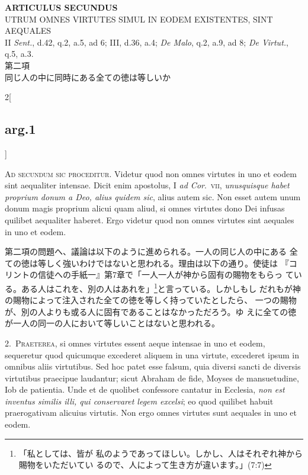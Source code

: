 \documentclass[paper=a4paper,fontsize=10pt,jafontsize=9pt,titlepage]{jlreq}
\begin{document}
\begin{center}
{\Large {\bfseries ARTICULUS SECUNDUS}}\\
{\large UTRUM OMNES VIRTUTES SIMUL IN EODEM EXISTENTES, SINT AEQUALES}\\
{\footnotesize II {\itshape Sent.}, d.42, q.2, a.5, ad 6; III, d.36, a.4; {\itshape De Malo}, q.2, a.9, ad 8; {\itshape De Virtut.}, q.5, a.3.}\\
{\Large 第二項\\同じ人の中に同時にある全ての徳は等しいか}
\end{center}

\begin{paracol}{2}[\subsection{arg.1}]

{\scshape Ad secundum sic proceditur}. Videtur quod non omnes virtutes
in uno et eodem sint aequaliter intensae. Dicit enim apostolus, I
{\itshape ad Cor}.~{\scshape vii}, {\itshape unusquisque habet
proprium donum a Deo, alius quidem sic}, alius autem sic. Non esset
autem unum donum magis proprium alicui quam aliud, si omnes virtutes
dono Dei infusas quilibet aequaliter haberet. Ergo videtur quod non
omnes virtutes sint aequales in uno et eodem.

\switchcolumn

第二項の問題へ、議論は以下のように進められる。一人の同じ人の中にある
 全ての徳は等しく強いわけではないと思われる。理由は以下の通り。使徒は
 『コリントの信徒への手紙一』第7章で「一人一人が神から固有の賜物をもらっ
 ている。ある人はこれを、別の人はあれを」\footnote{「私としては、皆が
 私のようであってほしい。しかし、人はそれぞれ神から賜物をいただいてい
 るので、人によって生き方が違います。」(7:7)}と言っている。しかしもし
 だれもが神の賜物によって注入された全ての徳を等しく持っていたとしたら、
 一つの賜物が、別の人よりも或る人に固有であることはなかっただろう。ゆ
 えに全ての徳が一人の同一の人において等しいことはないと思われる。


2.~{\scshape Praeterea}, si omnes virtutes essent aeque intensae in
uno et eodem, sequeretur quod quicumque excederet aliquem in una
virtute, excederet ipsum in omnibus aliis virtutibus. Sed hoc patet
esse falsum, quia diversi sancti de diversis virtutibus praecipue
laudantur; sicut Abraham de fide, Moyses de mansuetudine, Iob de
patientia. Unde et de quolibet confessore cantatur in Ecclesia,
{\itshape non est inventus similis illi, qui conservaret legem
excelsi}; eo quod quilibet habuit praerogativam alicuius virtutis. Non
ergo omnes virtutes sunt aequales in uno et eodem.


\end{paracol}
\end{document}
